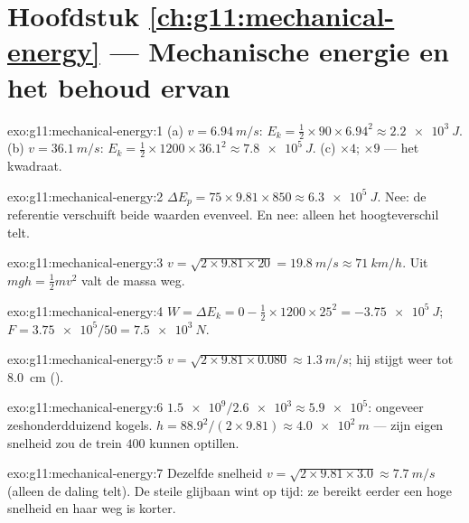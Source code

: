 \section*{Hoofdstuk \ref{ch:g11:mechanical-energy} --- Mechanische energie en het behoud ervan}

\begin{solution}{exo:g11:mechanical-energy:1}
(a) $v = \qty{6.94}{m/s}$:
$E_k = \tfrac12 \times 90 \times 6.94^2 \approx \qty{2.2e3}{J}$.
(b) $v = \qty{36.1}{m/s}$:
$E_k = \tfrac12 \times 1200 \times 36.1^2 \approx \qty{7.8e5}{J}$.
(c) $\times 4$; $\times 9$ --- het kwadraat.
\end{solution}

\begin{solution}{exo:g11:mechanical-energy:2}
$\Delta E_p = 75 \times 9.81 \times 850 \approx \qty{6.3e5}{J}$. Nee: de
referentie verschuift beide waarden evenveel. En nee: alleen het
hoogteverschil telt.
\end{solution}

\begin{solution}{exo:g11:mechanical-energy:3}
$v = \sqrt{2 \times 9.81 \times 20} = \qty{19.8}{m/s} \approx
\qty{71}{km/h}$. Uit $mgh = \tfrac12 mv^2$ valt de massa weg.
\end{solution}

\begin{solution}{exo:g11:mechanical-energy:4}
$W = \Delta E_k = 0 - \tfrac12 \times 1200 \times 25^2 =
\qty{-3.75e5}{J}$; $F = \num{3.75e5}/50 = \qty{7.5e3}{N}$.
\end{solution}

\begin{solution}{exo:g11:mechanical-energy:5}
$v = \sqrt{2 \times 9.81 \times 0.080} \approx \qty{1.3}{m/s}$; hij
stijgt weer tot \qty{8.0}{cm} ().
\end{solution}

\begin{solution}{exo:g11:mechanical-energy:6}
$\num{1.5e9}/\num{2.6e3} \approx \num{5.9e5}$: ongeveer zeshonderdduizend
kogels. $h = 88.9^2/(2 \times 9.81) \approx \qty{4.0e2}{m}$ --- zijn
eigen snelheid zou de trein $400$  kunnen optillen.
\end{solution}

\begin{solution}{exo:g11:mechanical-energy:7}
Dezelfde snelheid $v = \sqrt{2 \times 9.81 \times 3.0} \approx
\qty{7.7}{m/s}$ (alleen de daling telt). De steile glijbaan wint op tijd:
ze bereikt eerder een hoge snelheid en haar weg is korter.
\end{solution}

